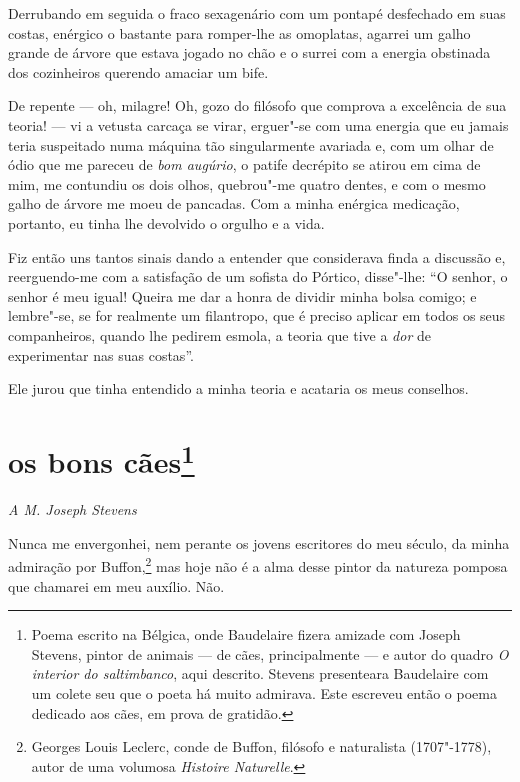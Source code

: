 Derrubando em seguida o fraco sexagenário com um pontapé desfechado em suas costas, enérgico o
bastante para romper-lhe as omoplatas, agarrei um galho grande de árvore que estava jogado no
chão e o surrei com a energia obstinada dos cozinheiros querendo
amaciar um bife.

De repente --- oh, milagre! Oh, gozo do filósofo que comprova a
excelência de sua teoria! --- vi a vetusta carcaça se virar,
erguer"-se com uma energia que eu jamais teria suspeitado numa máquina
tão singularmente avariada e, com um olhar de ódio que me pareceu de
\textit{bom augúrio}, o patife decrépito se atirou em cima de mim, me contundiu
os dois olhos, quebrou"-me quatro dentes, e com o mesmo galho de
árvore me moeu de pancadas. Com a minha enérgica medicação, portanto, eu 
tinha lhe devolvido o orgulho e a vida.

Fiz então uns tantos sinais dando a entender que considerava
finda a discussão e, reerguendo-me com a satisfação de um sofista do
Pórtico, disse"-lhe: “O senhor, o senhor é meu igual!
Queira me dar a honra de dividir minha bolsa comigo; e lembre"-se, se for
realmente um filantropo, que é preciso aplicar em todos
os seus companheiros, quando lhe pedirem esmola, a teoria que tive a
\textit{dor} de experimentar nas suas costas''.

Ele jurou que tinha entendido a minha teoria e acataria os meus
conselhos.

\quebra\section[Os bons cães]{os bons cães\protect\footnote{ Poema escrito na Bélgica, 
onde Baudelaire fizera amizade com Joseph
Stevens, pintor de animais --- de cães, principalmente --- e autor do quadro {\itshape O
interior do saltimbanco}, aqui descrito. Stevens presenteara Baudelaire
com um colete seu que o poeta há muito admirava. Este escreveu então o
poema dedicado aos cães, em prova de gratidão.}}

\begin{flushright}
\textit{A M. Joseph Stevens} 
\end{flushright}

Nunca me envergonhei, nem perante os jovens escritores do meu século,
da minha admiração por Buffon,\protect\footnote{ Georges Louis Leclerc, 
conde de Buffon, filósofo e naturalista
(1707"-1778), autor de uma volumosa \textit{Histoire Naturelle}.}
mas hoje não é a alma
desse pintor da natureza pomposa que chamarei em meu auxílio. Não.


